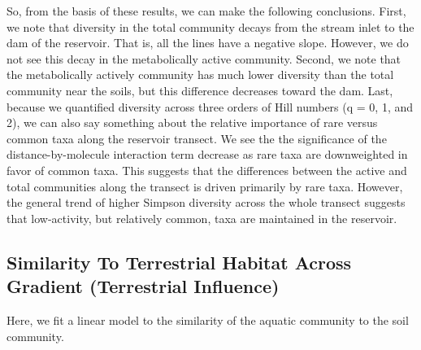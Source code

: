 \documentclass[]{article}
\begin{document}
So, from the basis of these results, we can make the following
conclusions. First, we note that diversity in the total community decays
from the stream inlet to the dam of the reservoir. That is, all the
lines have a negative slope. However, we do not see this decay in the
metabolically active community. Second, we note that the metabolically
actively community has much lower diversity than the total community
near the soils, but this difference decreases toward the dam. Last,
because we quantified diversity across three orders of Hill numbers (q =
0, 1, and 2), we can also say something about the relative importance of
rare versus common taxa along the reservoir transect. We see the the
significance of the distance-by-molecule interaction term decrease as
rare taxa are downweighted in favor of common taxa. This suggests that
the differences between the active and total communities along the
transect is driven primarily by rare taxa. However, the general trend of
higher Simpson diversity across the whole transect suggests that
low-activity, but relatively common, taxa are maintained in the
reservoir.

\hypertarget{similarity-to-terrestrial-habitat-across-gradient-terrestrial-influence}{%
\subsection{Similarity To Terrestrial Habitat Across Gradient
(Terrestrial
Influence)}\label{similarity-to-terrestrial-habitat-across-gradient-terrestrial-influence}}

Here, we fit a linear model to the similarity of the aquatic community
to the soil community.
\end{document}
